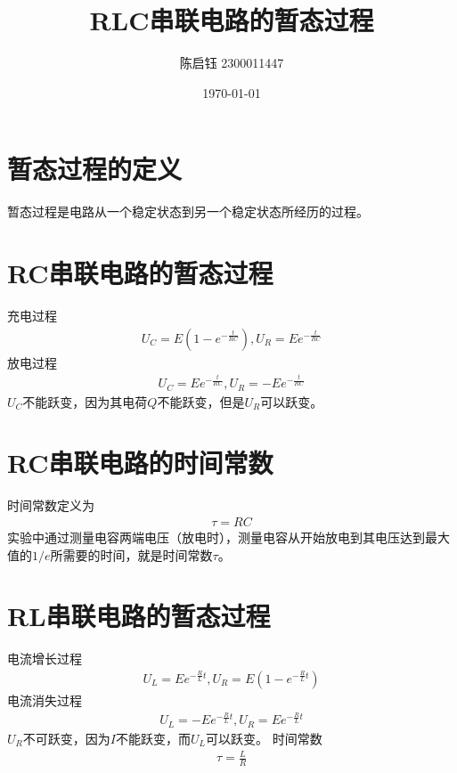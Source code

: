 \documentclass{ctexart}
\title{RLC串联电路的暂态过程}
\author{陈启钰\,\,2300011447}
\date{\today}
\begin{document}
	\maketitle
	\section{暂态过程的定义}
	暂态过程是电路从一个稳定状态到另一个稳定状态所经历的过程。
	\section{RC串联电路的暂态过程}
	充电过程
	\begin{align}
		U_C=E\left(1-e^{-\frac{t}{RC}}\right),U_R=Ee^{-\frac{t}{RC}}
	\end{align}
	放电过程
	\begin{align}
		U_C=Ee^{-\frac{t}{RC}},U_R=-Ee^{-\frac{t}{RC}}
	\end{align}
	$U_C$不能跃变，因为其电荷$Q$不能跃变，但是$U_R$可以跃变。
	\section{RC串联电路的时间常数}
	时间常数定义为
	\begin{align}
		\tau=RC
	\end{align}
	实验中通过测量电容两端电压（放电时），测量电容从开始放电到其电压达到最大值的$1/e$所需要的时间，就是时间常数$\tau$。
	\section{RL串联电路的暂态过程}
	电流增长过程
	\begin{align}
		U_L=Ee^{-\frac{R}{L}t},U_R=E\left(1-e^{-\frac{R}{L}t}\right)
	\end{align}
	电流消失过程
	\begin{align}
		U_L=-Ee^{-\frac{R}{L}t},U_R=Ee^{-\frac{R}{L}t}
	\end{align}
	$U_R$不可跃变，因为$I$不能跃变，而$U_L$可以跃变。
	时间常数
	\begin{align}
		\tau=\frac{L}{R}
	\end{align}
\end{document}
